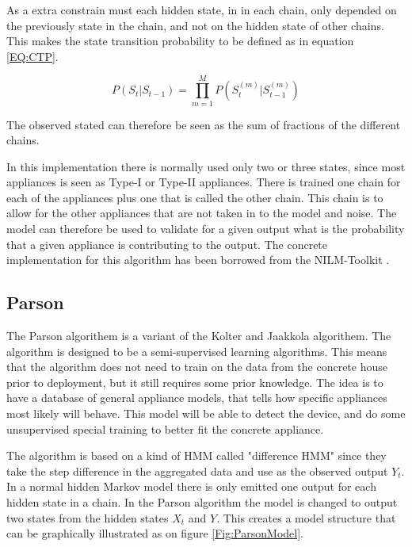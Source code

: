 As a extra constrain must each hidden state, in in each chain, only depended on the previously state in the chain, and not on the hidden state of other chains. This makes the state transition probability to be defined as in equation \ref{EQ:CTP}. 

\begin{equation}
	P(S_t|S_{t-1}) = \prod_{m = 1}^M P\left( S_t^{(m)}| S_{t-1}^{(m)} \right)
	\label{EQ:CTP}
\end{equation}

The observed stated can therefore be seen as the sum of fractions of the different chains. 

In this implementation there is normally used only two or three states, since most appliances is seen as Type-I or Type-II appliances. There is trained one chain for each of the appliances plus one that is called the other chain. This chain is to allow for the other appliances that are not taken in to the model and noise. The model can therefore be used to validate for a given output what is the probability that a given appliance is contributing to the output. The concrete implementation for this algorithm has been borrowed from the NILM-Toolkit \citep{RefWorks:21}. 

\subsection{Parson}
The Parson algorithem is a variant of the Kolter and Jaakkola algorithem\citep{RefWorks:22}. The algorithm is designed to be a semi-supervised learning algorithms. This means that the algorithm does not need to train on the data from the concrete house prior to deployment, but it still requires some prior knowledge. The idea is to have a database of general appliance models, that tells how specific appliances most likely will behave. This model will be able to detect the device, and do some unsupervised special training to better fit the concrete appliance. 

The algorithm is based on a kind of HMM called "difference HMM" since they take the step difference in the aggregated data and use as the observed output $Y_t$. In a normal hidden Markov model there is only emitted one output for each hidden state in a chain. In the Parson algorithm the model is changed to output two states from the hidden states $X_t$ and $Y$. This creates a model structure that can be graphically illustrated as on figure \ref{Fig:ParsonModel}\citep{RefWorks:28}. 

